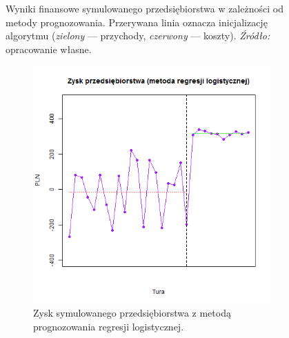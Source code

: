 \documentclass[polish, twoside, 12pt, a4paper]{article}
\theoremstyle{definition}
\theoremstyle{plain}
\theoremstyle{remark}
\begin{document}
\begin{figure}[hbt]
  \captionsetup{margin=10pt,font=small,labelfont=bf,width=.8\textwidth}

  \caption[Wyniki finansowe symulowanego przedsiębiorstwa w zależności od metody prognozowania]{Wyniki finansowe symulowanego przedsiębiorstwa w zależności od metody prognozowania. Przerywana linia oznacza inicjalizację algorytmu (\textit{zielony} --- przychody, \textit{czerwony} --- koszty). \textit{Źródło:} opracowanie własne.}\label{fig:wynikifin}
\end{figure}

\begin{figure}[hbt]
  \centering
  \begin{subfigure}[t]{0.6\textwidth}
    \includegraphics[width=\textwidth]{pictures/zysk_lm.png}
    \caption{Zysk symulowanego przedsiębiorstwa z metodą prognozowania regresji logistycznej.}
    \label{fig:przychod_koszt}
  \end{subfigure}
  \hfill
  \begin{subfigure}[t]{0.6\textwidth}


\end{subfigure}
\end{figure}
\end{document}
